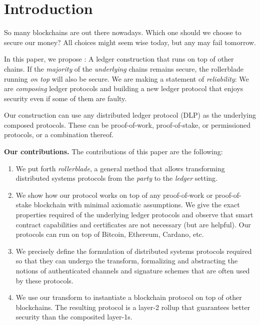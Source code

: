 \section{Introduction}


So many blockchains are out there nowadays. Which one should we choose to secure
our money? All choices might seem wise today, but any may fail tomorrow.

In this paper, we propose \rollerblade: A ledger construction
that runs on top of other chains. If the
\emph{majority} of the \emph{underlying} chains remains secure, the rollerblade running
\emph{on top} will also be secure.
We are making a statement of \emph{reliability}: We are \emph{composing}
ledger protocols and building a new ledger protocol that enjoys
security even if some of them are faulty.

Our construction can use any distributed ledger protocol (DLP) as the underlying
composed protocols. These can be proof-of-work, proof-of-stake, or permissioned
protocols, or a combination thereof.

\noindent
\textbf{Our contributions.} The contributions of this paper are the following:

\begin{enumerate}
  \item We put forth \emph{rollerblade}, a general method that allows transforming
        distributed systems protocols from the \emph{party} to the \emph{ledger}
        setting.
  \item We show how our protocol works on top of any proof-of-work or proof-of-stake
        blockchain with minimal axiomatic assumptions. We give the exact properties
        required of the underlying ledger protocols and observe that smart contract
        capabilities and certificates are not necessary (but are helpful). Our
        protocols can run on top of Bitcoin, Ethereum, Cardano, etc.
  \item We precisely define the formulation of distributed systems protocols
        required so that they can undergo the \rollerblade transform, formalizing
        and abstracting the notions of authenticated channels and signature schemes
        that are often used by these protocols.
  \item We use our transform to instantiate a blockchain protocol on top of
        other blockchains. The resulting protocol is a layer-2 rollup that
        guarantees better security than the composited layer-1s.
\end{enumerate}

